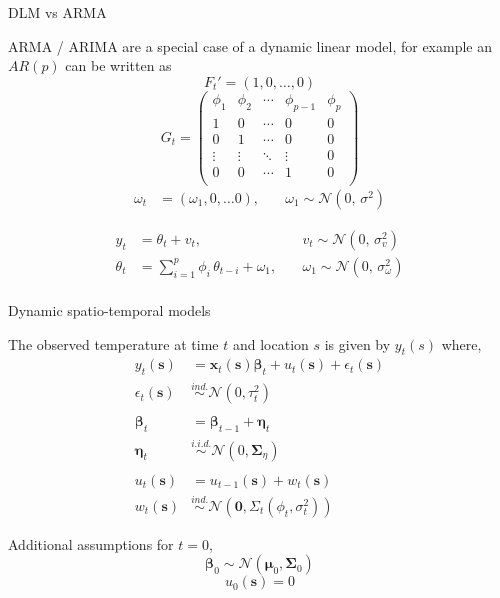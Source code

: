 \documentclass[11pt,ignorenonframetext,]{beamer}
\begin{document}
\begin{frame}[t]{DLM vs ARMA}

ARMA / ARIMA are a special case of a dynamic linear model, for example
an \(AR(p)\) can be written as \[ F_t' = (1, 0, \ldots, 0) \]
\[ G_t = \begin{pmatrix}
\phi_1 & \phi_2 & \cdots & \phi_{p-1} & \phi_p \\
1      & 0      & \cdots & 0          & 0      \\
0      & 1      & \cdots & 0          & 0      \\
\vdots & \vdots & \ddots & \vdots     & 0      \\
0      & 0      & \cdots & 1          & 0      \\
\end{pmatrix}\] \[ \begin{aligned}
\omega_t &= (\omega_1, 0, \ldots 0), 
\quad &\omega_1 \sim \mathcal{N}(0,\,\sigma^2)
\end{aligned}
\]

\pause

\vspace{2mm}

\[
\begin{aligned}
y_t &= \theta_t + v_t,
  \quad &v_t \sim \mathcal{N}(0,\, \sigma^2_v) \\
\theta_t &= \sum_{i=1}^p \phi_i\, \theta_{t-i} + \omega_1, 
  \quad &\omega_1 \sim \mathcal{N}(0,\, \sigma^2_\omega) \\
\end{aligned}
\]

\end{frame}

\begin{frame}{Dynamic spatio-temporal models}

\vspace{2mm}

The observed temperature at time \(t\) and location \(s\) is given by
\(y_t(s)\) where, \footnotesize
\[
\begin{aligned}
y_t(\bm{s}) & = \bm{x}_t(\bm{s})\bm{\beta}_t + u_t(\bm{s}) + \epsilon_t(\bm{s}) \\
\epsilon_t(\bm{s}) &\stackrel{ind.}\sim \mathcal{N}(0,\tau_{t}^2) \\
\\
\bm{\beta}_t & = \bm{\beta}_{t-1} + \bm{\eta}_t \\
\bm{\eta}_t &\stackrel{i.i.d.}\sim \mathcal{N}(0,\bm{\Sigma}_{\eta}) \\
\\
u_t(\bm{s}) &= u_{t-1}(\bm{s}) + w_t(\bm{s}) \\
w_t(\bm{s}) &\stackrel{ind.}{\sim} \mathcal{N}\left(\bm{0}, \Sigma_t(\phi_t, \sigma^2_t)\right)
\end{aligned}
\]

\vspace{3mm}

\pause

\normalsize
Additional assumptions for \(t=0\), \footnotesize
\[\bm\beta_{0} \sim \mathcal{N}(\bm{\mu}_0, \bm{\Sigma}_0)\]
\[u_{0}(\bm{s}) = 0\]

\end{frame}
\end{document}
